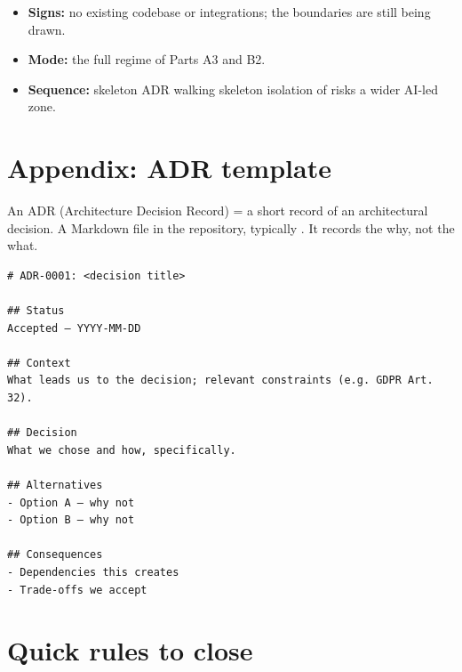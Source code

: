 \begin{itemize}
\item \textbf{Signs:} no existing codebase or integrations; the boundaries are still being drawn.
\item \textbf{Mode:} the full regime of Parts A3 and B2.
\item \textbf{Sequence:} skeleton \then{} ADR \then{} walking skeleton \then{} isolation of risks \then{} a wider AI-led zone.
\end{itemize}

\section{Appendix: ADR template}

An ADR (Architecture Decision Record) = a short record of an architectural decision.
A Markdown file in the repository, typically .
It records the why, not the what.

\begin{tcolorbox}[colback=black!3,colframe=black!20,boxrule=0.4pt,arc=1pt,
  left=8pt,right=8pt,top=6pt,bottom=6pt,fontupper=\ttfamily\small]
\begin{verbatim}
# ADR-0001: <decision title>

## Status
Accepted — YYYY-MM-DD

## Context
What leads us to the decision; relevant constraints (e.g. GDPR Art. 32).

## Decision
What we chose and how, specifically.

## Alternatives
- Option A — why not
- Option B — why not

## Consequences
- Dependencies this creates
- Trade-offs we accept
\end{verbatim}
\end{tcolorbox}

\section{Quick rules to close}

